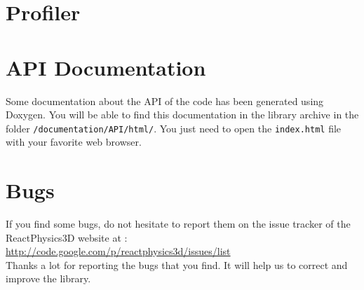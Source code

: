 \documentclass[a4paper,12pt]{article}
\begin{document}
    \section{Profiler}

   \section{API Documentation}

   Some documentation about the API of the code has been generated
   using Doxygen. You will be able to find this documentation in the library archive in the folder \texttt{/documentation/API/html/}. You just
   need to open the \texttt{index.html} file with your favorite web browser.

    \section{Bugs}

    If you find some bugs, do not hesitate to report them on the issue tracker of the ReactPhysics3D website at : \\

    \url{http://code.google.com/p/reactphysics3d/issues/list} \\

    Thanks a lot for reporting the bugs that you find. It will help us to correct and improve the library.
   
\end{document}
